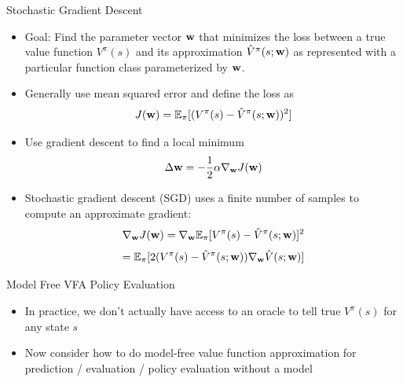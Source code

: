 \documentclass[aspectratio=169]{../latex_main/tntbeamer}  %
\begin{document}
\begin{frame}[c]{Stochastic Gradient Descent}
	
	
	\begin{itemize}
		\item Goal: Find the parameter vector $\mathbf{w}$ that minimizes the loss between a
		true value function $V^{\pi}(s)$ and its approximation $\hat{V}^\pi(s; \mathbf{w})$ as
		represented with a particular function class parameterized by $\mathbf{w}$.
		\item Generally use mean squared error and define the loss as 
		$$ J(\mathbf{w}) = \mathbb{E}_{\pi} [(V^\pi(s) - \hat{V}^\pi(s;\mathbf{w}))^2]$$
		\item Use gradient descent to find a local minimum 
		$$ \Delta \mathbf{w} = - \frac{1}{2} \alpha \nabla_{\mathbf{w}} J(\mathbf{w})$$
		\item Stochastic gradient descent (SGD) uses a finite number of samples to compute an approximate gradient:
		$$ \nabla_{\mathbf{w}} J(\mathbf{w}) = \nabla_{\mathbf{w}} \mathbb{E}_{\pi}[V^\pi (s) - \hat{V}^\pi (s; \mathbf{w})]^2$$
		$$= \mathbb{E}_\pi [2 (V^\pi(s) - \hat{V}^\pi (s;\mathbf{w})) \nabla_{\mathbf{w}} \hat{V}(s;\mathbf{w})]$$
	\end{itemize}
	
\end{frame}
\begin{frame}[c]{Model Free VFA Policy Evaluation}
	
	
	\begin{itemize}
		\item In practice, we don’t actually have access to an oracle to tell true $V^\pi(s)$ for any
		state $s$
		\item Now consider how to do model-free value function approximation for
		prediction / evaluation / policy evaluation without a model
	\end{itemize}
	
\end{frame}
\end{document}
